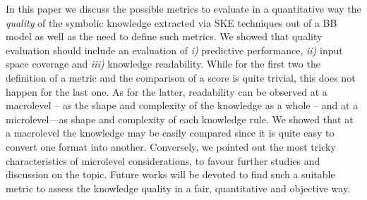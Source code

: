 \documentclass[sigconf]{acmart}
\begin{document}
In this paper we discuss the possible metrics to evaluate in a quantitative way the \emph{quality} of the symbolic knowledge extracted via SKE techniques out of a BB model as well as the need to define such metrics.
%
We showed that quality evaluation should include an evaluation of \textit{i)} predictive performance, \textit{ii)} input space coverage and \textit{iii)} knowledge readability.
%
While for the first two the definition of a metric and the comparison of a score is quite trivial, this does not happen for the last one.
%
As for the latter, readability can be observed at a macrolevel -- as the shape and complexity of the knowledge as a whole -- and at a microlevel---as shape and complexity of each knowledge rule.
%
We showed that at a macrolevel the knowledge may be easily compared since it is quite easy to convert one format into another.
%
Conversely, we pointed out the most tricky characteristics of microlevel considerations, to favour further studies and discussion on the topic.
%
Future works will be devoted to find such a suitable metric to assess the knowledge quality in a fair, quantitative and objective way.




\end{document}
